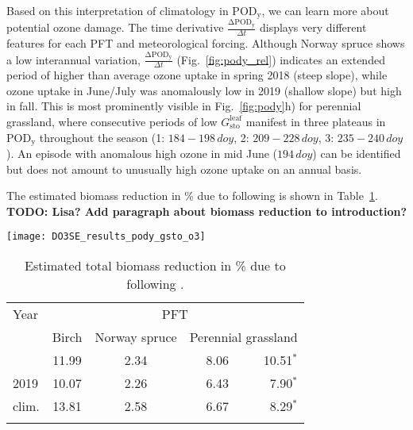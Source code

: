 \documentclass[bg, manuscript]{copernicus}
\begin{document}
Based on this interpretation of climatology in $\mathrm{POD_y}$, we can learn more about potential ozone damage. The time derivative $\frac{\mathrm{\Delta POD_y}}{\Delta t}$ displays very different features for each PFT and meteorological forcing. Although Norway spruce shows a low interannual variation, $\frac{\mathrm{\Delta POD_y}}{\Delta t}$ (Fig.~\ref{fig:pody_rel}) indicates an extended period of higher than average ozone uptake in spring 2018 (steep slope), while ozone uptake in June/July was anomalously low in 2019 (shallow slope) but high in fall. This is most prominently visible in Fig.~\ref{fig:pody}h) for perennial grassland, where consecutive periods of low $G_\text{sto}^\text{leaf}$ manifest in three plateaus in $\mathrm{POD_y}$ throughout the season (1: $184-198\,\unit{doy}$, 2: $209-228\,\unit{doy}$, 3: $235-240\,\unit{doy}$). An episode with anomalous high ozone in mid June ($194\,\unit{doy}$) can be identified but does not amount to unusually high ozone uptake on an annual basis.

The estimated biomass reduction in \unit{\%} due to  following \citet{ICP:MappingManual2017} is shown in Table~\ref{tab:biomass_reduction}. {\bf TODO: Lisa? Add paragraph about biomass reduction to introduction?}

\begin{figure*}[t]
  \texttt{[image: DO3SE\_results\_pody\_gsto\_o3]}
  \caption{$\mathrm{POD_y}$ modeling results from DO3SE model for three different PFTs over day of year (doy), March--October. A flux threshold $y=1\,\unit{nmol\,m^{-2}\,s^{-1}}$ per projected leaf area (PLA) has been chosen. \chem{[O_3]} are plotted on the same axis and scales as $G_\text{sto}^\text{leaf}$ but in units of $\unit{ppb}$. Due to non linearity in stomatal conductance, the climatological year represents rather an optimal year then a true climatology. (a)--(c) Birch; (d)--(f) Norway spruce; (g)--(i) perennial grassland. From left to right: 2018, 2019, and climatological year.}
  \label{fig:pody}
\end{figure*}


\begin{table}[t]
  \caption{Estimated total biomass reduction in \unit{\%} due to  following \citet{ICP:MappingManual2017}.}
  \label{tab:biomass_reduction}
\begin{tabular}{lccrr}
\tophline
Year & \multicolumn{4}{c}{PFT}\\
& Birch & Norway spruce & \multicolumn{2}{c}{Perennial grassland}\\
\middlehline
2018 & 11.99 & 2.34 & 8.06 & 10.51$^*$\\
2019 & 10.07 & 2.26 & 6.43 & 7.90$^*$\\
clim. & 13.81 & 2.58 & 6.67 & 8.29$^*$\\
\bottomhline
\end{tabular}
\end{table}
\end{document}
